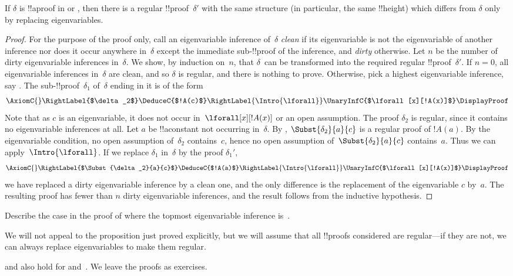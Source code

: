 \documentclass[../../../include/open-logic-section]{subfiles}
\begin{document}
\begin{prop}
If $\delta$ is !!a{proof} in  or , then there is a
regular !!{proof}~$\delta'$ with the same structure (in particular, the
same !!{height}) which differs from $\delta$ only by replacing
eigenvariables.
\end{prop}

\begin{proof}
For the purpose of the proof only, call an eigenvariable inference
of~$\delta$ \emph{clean} if its eigenvariable is not the eigenvariable of
another inference nor does it occur anywhere in~$\delta$ except the
immediate sub-!!{proof} of the inference, and \emph{dirty} otherwise.
Let $n$ be the number of dirty eigenvariable inferences in~$\delta$. We
show, by induction on~$n$, that $\delta$~can be transformed into the
required regular !!{proof}~$\delta'$. If $n=0$, all eigenvariable
inferences in~$\delta$ are clean, and so $\delta$ is regular, and there is
nothing to prove. Otherwise, pick a highest eigenvariable inference,
say \Intro{\lforall}. The sub-!!{proof}~$\delta_1$ of~$\delta$ ending in it
is of the form
    \[
    \AxiomC{}
    \RightLabel{$\delta_2$}
    \DeduceC{$!A(c)$}
    \RightLabel{\Intro{\lforall}}
    \UnaryInfC{$\lforall[x][!A(x)]$}
    \DisplayProof
    \]
Note that as $c$ is an eigenvariable, it does not occur
in~$\lforall[x][!A(x)]$ or an open assumption. The proof $\delta_2$ is
regular, since it contains no eigenvariable inferences at all. Let $a$
be !!a{constant} not occurring in~$\delta$. By
, $\Subst{\delta_2}{a}{c}$ is a regular proof
of $!A(a)$. By the eigenvariable condition, no open assumption
of~$\delta_2$ contains~$c$, hence no open assumption
of~$\Subst{\delta_2}{a}{c}$ contains~$a$. Thus we can
apply~$\Intro{\lforall}$. If we replace $\delta_1$ in~$\delta$ by the
proof $\delta_1'$,
    \[
    \AxiomC{}
    \RightLabel{$\Subst{\delta_2}{a}{c}$}
    \DeduceC{$!A(a)$}
    \RightLabel{\Intro{\lforall}}
    \UnaryInfC{$\lforall[x][!A(x)]$}
    \DisplayProof
    \]
we have replaced a dirty eigenvariable inference by a clean one, and
the only difference is the replacement of the eigenvariable $c$
by~$a$. The resulting proof has fewer than $n$ dirty eigenvariable inferences,
and the result follows from the inductive hypothesis.
\end{proof}

\begin{prob}
Describe the case in the proof of  where the
topmost eigenvariable inference is~\Elim{\lexists}.
\end{prob}

We will not appeal to the proposition just proved explicitly, but we
will assume that all !!{proof}s considered are regular---if they are
not, we can always replace eigenvariables to make them regular.

 and  also hold for
 and~. We leave the proofs as exercises.
\end{document}
